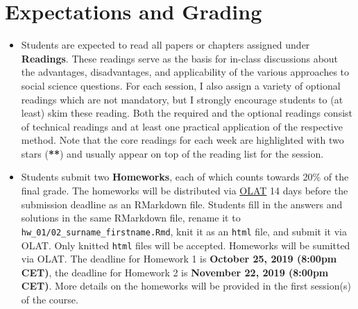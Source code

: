 \documentclass[abstract=on,parskip=full,headings=standardclasses,fontsize=11pt,paper=a4]{scrartcl}
\begin{document}
\section*{Expectations and Grading}


\begin{itemize}
\item Students are expected to read all papers or chapters assigned under \textbf{Readings}. These readings serve as the basis for in-class discussions about the advantages, disadvantages, and applicability of the various approaches to social science questions. For each session, I also assign a variety of optional readings which are not mandatory, but I strongly encourage students to (at least) skim these reading. Both the required  and the optional readings consist of technical  readings and at least one practical application of the respective method. Note that the core readings for each week are highlighted with two stars (\textbf{**}) and usually appear on top of the reading list for the session.

\item Students submit two \textbf{Homeworks}, each of which counts towards  20\% of the final grade. The homeworks will be distributed via \href{https://lms.uzh.ch/url/RepositoryEntry/16539681118?guest=true&lang=en}{OLAT} 14 days before the submission deadline as an RMarkdown file. Students fill in the answers and solutions in the same RMarkdown file, rename it  to \texttt{hw\_01/02\_surname\_firstname.Rmd}, knit it as an \texttt{html} file, and submit it via OLAT. Only knitted \texttt{html} files will be accepted. Homeworks will be sumitted via OLAT. The deadline for Homework 1 is \textbf{October 25, 2019 (8:00pm CET)}, the deadline for Homework 2 is \textbf{November 22, 2019 (8:00pm CET)}. More details on the homeworks will be provided in the first session(s) of the course. 


\end{itemize}
\end{document}
